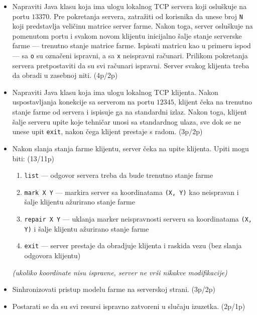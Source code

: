 \documentclass[]{article}
\begin{document}
\begin{enumerate}
\begin{itemize}
  \item Napraviti Java klasu koja ima ulogu lokalnog TCP servera koji osluškuje na portu $13370$. Pre pokretanja servera, zatra\v{z}iti od korisnika da unese broj \texttt{N} koji predstavlja veli\v{c}inu matrice server farme. Nakon toga, server oslu\v{s}kuje na pomenutom portu i svakom novom klijentu inicijalno \v{s}alje stanje serverske farme --- trenutno stanje matrice farme. Ispisati matricu kao u primeru ispod --- sa \texttt{o} su ozna\v{c}eni ispravni, a sa \texttt{x} neispravni ra\v{c}unari. Prilikom pokretanja servera pretpostaviti da su svi ra\v{c}unari ispravni. Server svakog klijenta treba da obradi u zasebnoj niti. \hfill (4p/2p)
  \item Napraviti Java klasu koja ima ulogu lokalnog TCP klijenta. Nakon uspostavljanja konekcije sa serverom na portu $12345$, klijent čeka na trenutno stanje farme od servera i ispisuje ga na standardni izlaz. Nakon toga, klijent \v{s}alje serveru upite koje tehni\v{c}ar unosi sa standardnog ulaza, sve dok se ne unese upit \texttt{exit}, nakon \v{c}ega klijent prestaje s radom. \hfill (3p/2p)
  \item Nakon slanja stanja farme klijentu, server \v{c}eka na upite klijenta. Upiti mogu biti:  \hfill (13/11p)
  \begin{enumerate}
    \item \texttt{list} --- odgovor servera treba da bude trenutno stanje farme
    \item \texttt{mark X Y} --- markira server sa koordinatama \texttt{(X, Y)} kao neispravan i \v{s}alje klijentu a\v{z}urirano stanje farme
    \item \texttt{repair X Y} --- uklanja marker neispravnosti serveru sa koordinatama \texttt{(X, Y)} i \v{s}alje klijentu a\v{z}urirano stanje farme
    \item \texttt{exit} --- server prestaje da obradjuje klijenta i raskida vezu (bez slanja odgovora klijentu)
  \end{enumerate}
  \textit{(ukoliko koordinate nisu ispravne, server ne vr\v{s}i nikakve modifikacije)}
  \item Sinhronizovati pristup modelu farme na serverskoj strani. \hfill (3p/2p)
  \item Postarati se da su svi resursi ispravno zatvoreni u slučaju izuzetka. \hfill (2p/1p)
\end{itemize}

\vspace{10pt}


\end{enumerate}
\end{document}
